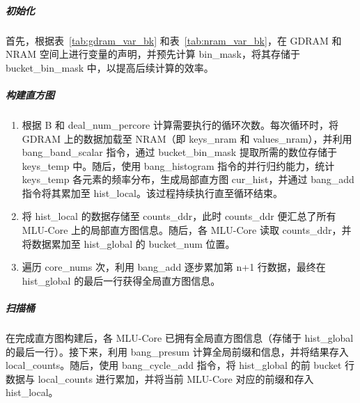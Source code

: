 
\subparagraph{初始化}

首先，根据表~\ref{tab:gdram_var_bk} 和表~\ref{tab:nram_var_bk}，在 GDRAM 和 NRAM 空间上进行变量的声明，并预先计算 bin\_mask，将其存储于 bucket\_bin\_mask 中，以提高后续计算的效率。

\subparagraph{构建直方图}

\begin{enumerate}
    \item 根据 B 和 deal\_num\_percore 计算需要执行的循环次数。每次循环时，将 GDRAM 上的数据加载至 NRAM（即 keys\_nram 和 values\_nram），并利用 bang\_band\_scalar 指令，通过 bucket\_bin\_mask 提取所需的数位存储于 keys\_temp 中。随后，使用 bang\_histogram 指令的并行归约能力，统计 keys\_temp 各元素的频率分布，生成局部直方图 cur\_hist，并通过 bang\_add 指令将其累加至 hist\_local。该过程持续执行直至循环结束。
    
    \item 将 hist\_local 的数据存储至 counts\_ddr，此时 counts\_ddr 便汇总了所有 MLU-Core 上的局部直方图信息。随后，各 MLU-Core 读取 counts\_ddr，并将数据累加至 hist\_global 的 bucket\_num 位置。

    \item 遍历 core\_nums 次，利用 bang\_add 逐步累加第 n+1 行数据，最终在 hist\_global 的最后一行获得全局直方图信息。
\end{enumerate}

\subparagraph{扫描桶}

在完成直方图构建后，各 MLU-Core 已拥有全局直方图信息（存储于 hist\_global 的最后一行）。接下来，利用 bang\_presum 计算全局前缀和信息，并将结果存入 local\_counts。随后，使用 bang\_cycle\_add 指令，将 hist\_global 的前 bucket 行数据与 local\_counts 进行累加，并将当前 MLU-Core 对应的前缀和存入 hist\_local。

